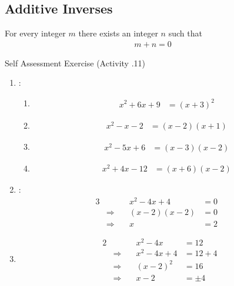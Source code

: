 \documentclass[../notes.tex]{subfiles}
\begin{document}
			\subsection{Additive Inverses}
				For every integer $m$ there exists an integer $n$ such that
				\begin{align*}
					m + n = 0
				\end{align*}
			\pagebreak
			\begin{exercise}{Self Assessment Exercise (Activity \thechapter.11)}
				\begin{enumerate}
					\item {}:
						\begin{enumerate}[label=(\alph*)]
							\item
								\begin{align*}
									x^{2} + 6x + 9 &= (x + 3)^{2}
								\end{align*}
							\item
								\begin{align*}
									x^{2} - x - 2 &= (x - 2)(x + 1)
								\end{align*}
							\item
								\begin{align*}
									x^{2} - 5x + 6 &= (x - 3)(x - 2)
								\end{align*}
							\item
								\begin{align*}
									x^{2} + 4x - 12 &= (x + 6)(x - 2)
								\end{align*}
						\end{enumerate}
					\item {}:
						\begin{alignat*}{3}
							& \qquad & x^{2} - 4x + 4 &= 0\\
							& \Rightarrow \quad & (x - 2)(x - 2) &= 0\\
							& \Rightarrow \quad &x &= 2 &
						\end{alignat*}
					\item {}
						\begin{alignat*}{2}
							& \qquad &x^{2} - 4x &= 12\\
							& \Rightarrow \quad &x^{2} - 4x + 4 &= 12 + 4\\
							& \Rightarrow \quad &(x - 2)^{2} &= 16\\
							& \Rightarrow \quad & x - 2 &= \pm 4

\end{alignat*}
\end{enumerate}
\end{exercise}
\end{document}
